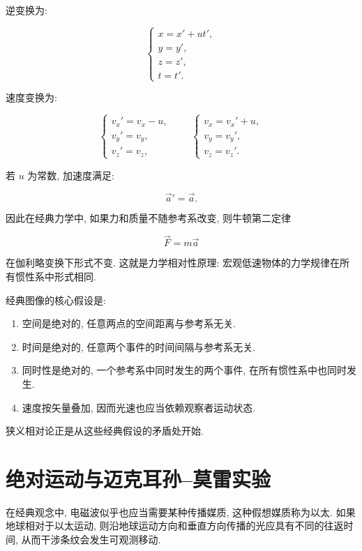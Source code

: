 \documentclass[
  a4paper,
]{ctexrep}
\providecommand{\tightlist}{%
  \setlength{\itemsep}{0pt}\setlength{\parskip}{0pt}}
\begin{document}
逆变换为:

\[
\begin{cases}
x = x' + ut', \\
y = y', \\
z = z', \\
t = t'.
\end{cases}
\]

速度变换为:

\[
\begin{cases}
v_x' = v_x - u, \\
v_y' = v_y, \\
v_z' = v_z,
\end{cases}
\qquad
\begin{cases}
v_x = v_x' + u, \\
v_y = v_y', \\
v_z = v_z'.
\end{cases}
\]

若 \(u\) 为常数, 加速度满足:

\[
\vec{a}' = \vec{a}.
\]

因此在经典力学中, 如果力和质量不随参考系改变, 则牛顿第二定律

\[
\vec{F} = m\vec{a}
\]

在伽利略变换下形式不变. 这就是力学相对性原理:
宏观低速物体的力学规律在所有惯性系中形式相同.

经典图像的核心假设是:

\begin{enumerate}
\def\labelenumi{\arabic{enumi}.}
\tightlist
\item
  空间是绝对的, 任意两点的空间距离与参考系无关.
\item
  时间是绝对的, 任意两个事件的时间间隔与参考系无关.
\item
  同时性是绝对的, 一个参考系中同时发生的两个事件,
  在所有惯性系中也同时发生.
\item
  速度按矢量叠加, 因而光速也应当依赖观察者运动状态.
\end{enumerate}

狭义相对论正是从这些经典假设的矛盾处开始.

\section{绝对运动与迈克耳孙--莫雷实验}\label{ux7eddux5bf9ux8fd0ux52a8ux4e0eux8fc8ux514bux8033ux5b59ux83abux96f7ux5b9eux9a8c}

在经典观念中, 电磁波似乎也应当需要某种传播媒质, 这种假想媒质称为以太.
如果地球相对于以太运动,
则沿地球运动方向和垂直方向传播的光应具有不同的往返时间,
从而干涉条纹会发生可观测移动.
\end{document}
